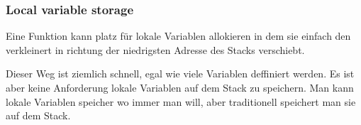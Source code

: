 \subsubsection{Local variable storage}

Eine Funktion kann platz für lokale Variablen allokieren in dem sie einfach den 
verkleinert in richtung der niedrigsten Adresse des Stacks verschiebt. 


Dieser Weg ist ziemlich schnell, egal wie viele Variablen deffiniert werden.
Es ist aber keine Anforderung lokale Variablen auf dem Stack zu speichern.
Man kann lokale Variablen speicher wo immer man will, aber traditionell speichert
man sie auf dem Stack.
